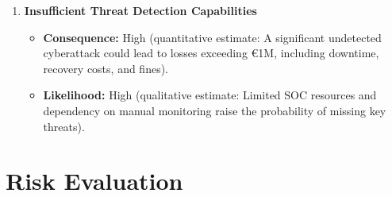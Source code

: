 \begin{enumerate}
    \item \textbf{Insufficient Threat Detection Capabilities}
    \begin{itemize}
        \item \textbf{Consequence:} High (quantitative estimate: A significant undetected cyberattack could lead to losses exceeding €1M, including downtime, recovery costs, and fines).
        \item \textbf{Likelihood:} High (qualitative estimate: Limited SOC resources and dependency on manual monitoring raise the probability of missing key threats).
    \end{itemize}
\end{enumerate}

\section{Risk Evaluation}


